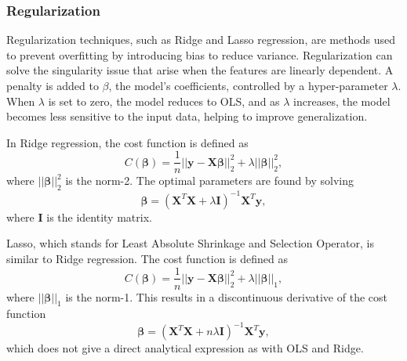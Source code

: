 \subsubsection{Regularization}\label{sssec:regularization}
Regularization techniques, such as Ridge and Lasso regression, are methods used to prevent overfitting by introducing bias to reduce variance. Regularization can solve the singularity issue that arise when the features are linearly dependent. A penalty is added to $\beta$, the model's coefficients, controlled by a hyper-parameter $\lambda$. When $\lambda$ is set to zero, the model reduces to OLS, and as $\lambda$ increases, the model becomes less sensitive to the input data, helping to improve generalization.

In Ridge regression, the cost function is defined as
\begin{equation}\label{eq:ridge_cost}
    C (\mathbf{\beta}) = \frac{1}{n} || \mathbf{y} - \mathbf{X} \mathbf{\beta} ||_{2}^{2} + \lambda || \mathbf{\beta} ||_{2}^{2} ,
\end{equation}
where $|| \mathbf{\beta} ||_{2}^{2}$ is the norm-2. The optimal parameters are found by solving
\begin{equation}\label{eq:ridge_beta}
    \mathbf{\beta} = (\mathbf{X}^{T}\mathbf{X} + \lambda \mathbf{I})^{-1} \mathbf{X}^{T} \mathbf{y},
\end{equation}
where $\mathbf{I}$ is the identity matrix.

Lasso, which stands for Least Absolute Shrinkage and Selection Operator, is similar to Ridge regression. The cost function is defined as 
\begin{equation}\label{eq:lasso_cost}
    C (\mathbf{\beta}) = \frac{1}{n} || \mathbf{y} - \mathbf{X} \mathbf{\beta} ||_{2}^{2} + \lambda || \mathbf{\beta} ||_{1} ,
\end{equation}
where $|| \mathbf{\beta} ||_{1}$ is the norm-1. This results in a discontinuous derivative of the cost function
\begin{equation}\label{eq:lasso_beta}
    \mathbf{\beta} = (\mathbf{X}^{T}\mathbf{X} + n \lambda \mathbf{I})^{-1} \mathbf{X}^{T} \mathbf{y},
\end{equation}
which does not give a direct analytical expression as with OLS and Ridge. 


